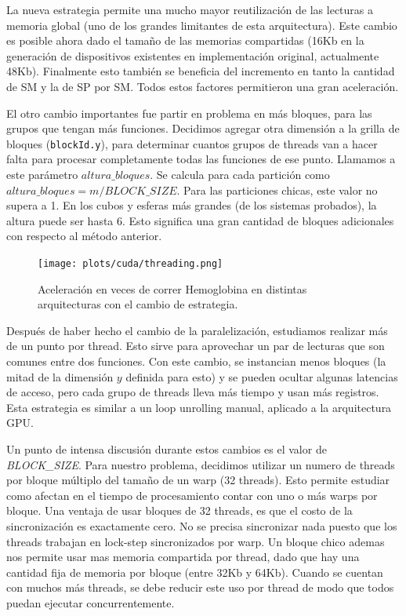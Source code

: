 La nueva estrategia permite una mucho mayor reutilizaci\'on de las lecturas a memoria
global (uno de los grandes limitantes de esta arquitectura). Este cambio es posible ahora
dado el tama\~no de las memorias compartidas (16Kb en la generaci\'on de
dispositivos existentes en implementaci\'on original, actualmente 48Kb). Finalmente
esto tambi\'en se beneficia del incremento en tanto la cantidad de SM y la de SP por
SM. Todos estos factores permitieron una gran aceleraci\'on.

El otro cambio importantes fue partir en problema en m\'as bloques, para las grupos que tengan
m\'as funciones. Decidimos agregar otra dimensi\'on a la grilla de bloques (\texttt{blockId.y}),
para determinar cuantos grupos de threads van a hacer falta para procesar completamente
todas las funciones de ese punto. Llamamos a este par\'ametro $altura\_bloques$. Se
calcula para cada partici\'on como $altura\_bloques = {m}/{BLOCK\_SIZE}$.
Para las particiones chicas, este valor no supera a 1. En los cubos y esferas m\'as
grandes (de los sistemas probados), la altura puede ser hasta 6. Esto significa una gran
cantidad de bloques adicionales con respecto al m\'etodo anterior.

\begin{figure}[htbp]
   \centering
   \texttt{[image: plots/cuda/threading.png]}
   \caption{Aceleraci\'on en veces de correr Hemoglobina en distintas arquitecturas con el cambio de estrategia.}
   \label{plt:threading}
\end{figure}


Despu\'es de haber hecho el cambio de la paralelizaci\'on, estudiamos realizar
m\'as de un punto por thread. Esto sirve para aprovechar un par de lecturas que son comunes
entre dos funciones. Con este cambio, se instancian menos bloques (la mitad de la dimensi\'on $y$
definida para esto) y se pueden ocultar algunas latencias de acceso, pero
cada grupo de threads lleva m\'as tiempo y usan m\'as registros. Esta estrategia es similar
a un loop unrolling manual, aplicado a la arquitectura GPU.

Un punto de intensa discusi\'on durante estos cambios es el valor de \textit{BLOCK\_SIZE}.
Para nuestro problema, decidimos utilizar un numero de threads por bloque m\'ultiplo del
tama\~no de un warp (32 threads). Esto permite estudiar como afectan en el tiempo de
procesamiento contar con uno o m\'as warps por bloque. Una ventaja de usar bloques de
32 threads, es que el costo de la sincronizaci\'on es exactamente cero. No se precisa
sincronizar nada puesto que los threads trabajan en lock-step sincronizados por warp.
Un bloque chico ademas nos permite usar mas memoria compartida por thread, dado que hay una
cantidad fija de memoria por bloque (entre 32Kb y 64Kb). Cuando se cuentan con muchos m\'as
threads, se debe reducir este uso por thread de modo que todos puedan ejecutar concurrentemente.


